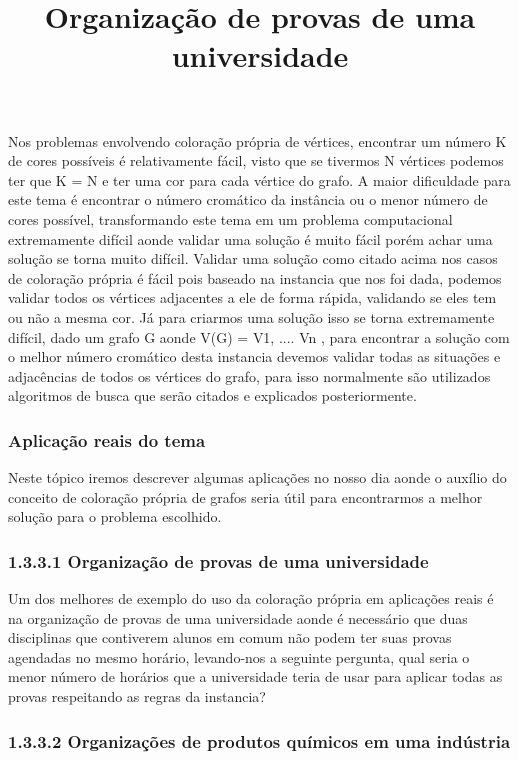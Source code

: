 \documentclass[12pt]{article}
\begin{document}
   	Nos problemas envolvendo coloração própria de vértices, encontrar um número K de cores possíveis é relativamente fácil, visto que se tivermos N vértices podemos ter que K = N e ter uma cor para cada vértice do grafo. A maior dificuldade para este tema é encontrar o número cromático da instância ou o menor número de cores possível, transformando este tema em um problema computacional extremamente difícil aonde validar uma solução é muito fácil porém achar uma solução se torna muito difícil.
   	Validar uma solução como citado acima nos casos de coloração própria é fácil pois baseado na instancia que nos foi dada, podemos validar todos os vértices adjacentes a ele de forma rápida, validando se eles tem ou não a mesma cor. Já para criarmos uma solução isso se torna extremamente difícil, dado um grafo G aonde V(G) = {V1, .... Vn }, para encontrar a solução com o melhor número cromático desta instancia devemos validar todas as situações e adjacências de todos os vértices do grafo, para isso normalmente são utilizados algoritmos de busca que serão citados e explicados posteriormente.
   	
   	\subsubsection{Aplicação reais do tema}
   	
   	Neste tópico iremos descrever algumas aplicações no nosso dia aonde o auxílio do conceito de coloração própria de grafos seria útil para encontrarmos a melhor solução para o problema escolhido.
   	
   \title{Organização de provas de uma universidade}
   
   \subsubsection*{1.3.3.1 Organização de provas de uma universidade}
  
   Um dos melhores de exemplo do uso da coloração própria em aplicações reais é na organização de provas de uma universidade aonde é necessário que duas disciplinas que contiverem alunos em comum não podem ter suas provas agendadas no mesmo horário, levando-nos a seguinte pergunta, qual seria o menor número de horários que a universidade teria de usar para aplicar todas as provas respeitando as regras da instancia?
   
   
   \subsubsection*{   1.3.3.2 Organizações de produtos químicos em uma indústria}
  
\end{document}

